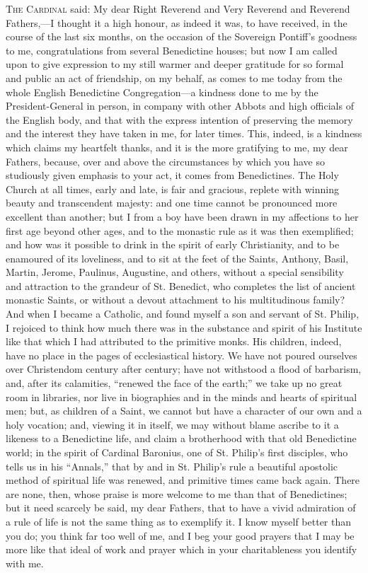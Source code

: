 T\textsc{he} C\textsc{ardinal}
said: My dear Right Reverend and Very Reverend and Reverend
Fathers,—I thought it a high honour, as indeed it was, to have
received, in the course of the last six months, on the occasion of the
Sovereign Pontiff's goodness to me, congratulations from several
Benedictine houses; but now I am called upon to give expression to my
still warmer and deeper gratitude for so formal and public an act of
friendship, on my behalf, as comes to me today from the whole English
Benedictine Congregation—a kindness done to me by the
President-General in person, in company with other Abbots and high
officials of the English body, and that with the express intention of
preserving the memory and the interest they have taken in me, for
later times. This, indeed, is a kindness which claims my heartfelt
thanks, and it is the more gratifying to me, my dear Fathers, because,
over and above the circumstances by which you have so studiously given
emphasis to your act, it comes from Benedictines. The Holy Church at
all times, early and late, is fair and gracious, replete with winning
beauty and transcendent majesty: and one time cannot be pronounced
more excellent than another; but I from a boy have been drawn in my
affections to her first age beyond other ages, and to the monastic
rule as it was then exemplified; and how was it possible to drink in
the spirit of early Christianity, and to be enamoured of its
loveliness, and to sit at the feet of the Saints, Anthony, Basil,
Martin, Jerome, Paulinus, Augustine, and others, without a special
sensibility and attraction to the grandeur of St. Benedict, who
completes the list of ancient monastic Saints, or without a devout
attachment to his multitudinous family? And when I became a Catholic,
and found myself a son and servant of St. Philip, I rejoiced to think
how much there was in the substance and spirit of his Institute like
that which I had attributed to the primitive monks. His children,
indeed, have no place in the pages of ecclesiastical history. We have
not poured ourselves over Christendom century after century; have not
withstood a flood of barbarism, and, after its calamities, ``renewed
the face of the earth;'' we take up no great room in libraries, nor
live in biographies and in the minds and hearts of spiritual men; but,
as children of a Saint, we cannot but have a character of our own and
a holy vocation; and, viewing it in itself, we may without blame
ascribe to it a likeness to a Benedictine life, and claim a
brotherhood with that old Benedictine world; in the spirit of Cardinal
Baronius, one of St. Philip's first disciples, who tells us in his ``Annals,''
that by and in St. Philip's rule a beautiful apostolic method of
spiritual life was renewed, and primitive times came back again. There
are none, then, whose praise is more welcome to me than that of
Benedictines; but it need scarcely be said, my dear Fathers, that to
have a vivid admiration of a rule of life is not the same thing as to
exemplify it. I know myself better than you do; you think far too well
of me, and I beg your good prayers that I may be more like that ideal
of work and prayer which in your charitableness you identify with me.

